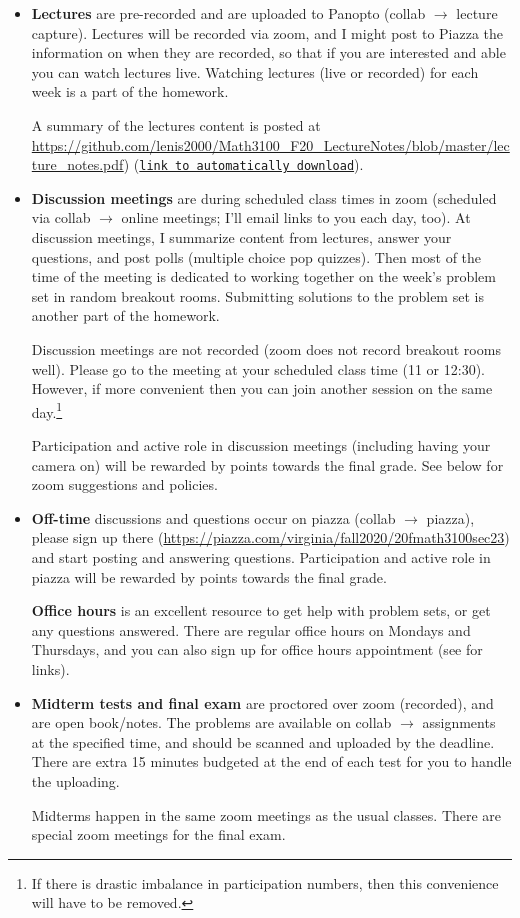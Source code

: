 \documentclass[oneside,11pt]{amsart}
\begin{document}
\begin{itemize}
	\item \textbf{Lectures} are pre-recorded and are uploaded to Panopto (collab $\to$ lecture capture). 
		Lectures will be recorded via zoom, and I might post to Piazza the information
		on when they are recorded, so that if you are interested and able you can watch lectures
		live.
		Watching lectures (live or recorded)
		for each week is a part of the homework.

		A summary of the lectures content is posted at 
		\url{https://github.com/lenis2000/Math3100_F20_LectureNotes/blob/master/lecture_notes.pdf})
		(\href{https://raw.githubusercontent.com/lenis2000/Math3100_F20_LectureNotes/master/lecture_notes.pdf}
		{\texttt{link to automatically download}}).
	\item \textbf{Discussion meetings} are during scheduled class times
		in zoom (scheduled via collab
		$\to$ online meetings; I'll email links to you each day, too). At
		discussion
		meetings, I summarize content from lectures, answer your 
		questions, and 
		post polls (multiple choice pop quizzes). Then most of the time
		of the meeting is dedicated to working together on the week's problem set in random breakout rooms.
		Submitting solutions to the problem set is another part of the homework.

		Discussion meetings are not recorded (zoom does not record breakout rooms well). 
		Please go to the meeting at your scheduled class time (11 or 12:30).
		However, if more convenient then 
		you can join another session on the same day.\footnote{If there is drastic imbalance
		in participation numbers, then this convenience will have to be removed.}

		Participation and active role in discussion meetings (including having 
		your camera on)
		will be rewarded by points towards the final grade.
		See  below for zoom suggestions and policies.

	\item \textbf{Off-time} discussions and questions 
		occur on piazza (collab $\to$ piazza), please sign up there 
		(\url{https://piazza.com/virginia/fall2020/20fmath3100sec23})
		and start
		posting and answering questions. 
		Participation and active role in piazza will be rewarded by points towards the final grade.

		\textbf{Office hours} is an excellent resource to get help with problem sets,
		or get any questions answered. There are regular office hours
		on Mondays and Thursdays, and you can also sign up for office hours appointment (see 
		for links).

	\item \textbf{Midterm tests and final exam} are proctored over zoom (recorded), and are open book/notes. 
		The problems are available on collab $\to$ assignments at the specified time, and 
		should be scanned and uploaded by the deadline. There are extra 15 minutes budgeted at the 
		end of each test for you to handle the uploading.

		Midterms happen in the same zoom meetings as the usual classes. There are special zoom meetings 
		for the final exam.
\end{itemize}
\end{document}

